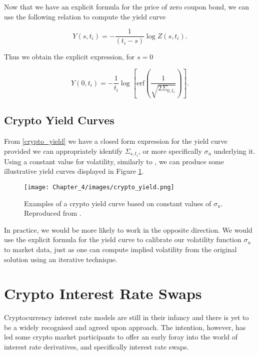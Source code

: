 Now that we have an explicit formula for the price of zero coupon bond, we can use the following relation to compute the yield curve \citep{wilmott2013paul}

\begin{equation}
    Y(s,t_i) = -\frac{1}{(t_i - s)} \log Z(s, t_i).
\end{equation}

Thus we obtain the explicit expression, for $s = 0$

\begin{equation}
\label{crypto_yield}
    Y(0,t_i) = -\frac{1}{t_i} \log \left[ \text{erf} \left(\frac{1}{ \sqrt{2 \Sigma_{0,t_i}}} \right) \right].
\end{equation}

\subsection{Crypto Yield Curves}
From \ref{crypto_yield} we have a closed form expression for the yield curve provided we can appropriately identify $\Sigma_{s,t_i}$, or more specifically $\sigma_u$ underlying it. Using a constant value for volatility, similarly to \cite{brody2020theory}, we can produce some illustrative yield curves displayed in Figure \ref{fig:crypto_yield}.

\begin{figure}[ht]
\begin{center}
\texttt{[image: Chapter\_4/images/crypto\_yield.png]}
\caption[Indicative Crypto Yield Curves]{Examples of a crypto yield curve based on constant values of $\sigma_u$. Reproduced from \cite{brody2020theory}.}
\label{fig:crypto_yield}
\end{center}
\end{figure}

In practice, we would be more likely to work in the opposite direction. We would use the explicit formula for the yield curve to calibrate our volatility function $\sigma_u$ to market data, just as one can compute implied volatility from the original \cite{black1973pricing} solution using an iterative technique.

\section{Crypto Interest Rate Swaps}
Cryptocurrency interest rate models are still in their infancy and there is yet to be a widely recognised and agreed upon approach. The intention, however, has led some crypto market participants to offer an early foray into the world of interest rate derivatives, and specifically interest rate swaps.

